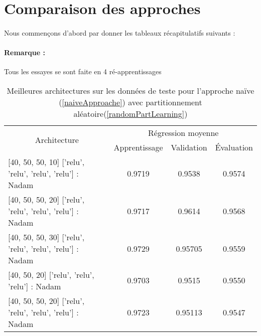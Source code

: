 \section{Comparaison des approches}
\paragraph{}Nous commençons d'abord par donner les tableaux récapitulatifs suivants :
\paragraph{Remarque : }Tous les essayes se sont faite en 4 ré-apprentissages 
\begin{table}[H]
	\centering
	\begin{tabular}{|l|c|c|c|}
		\hline
		\multicolumn{1}{|c|}{\multirow{2}{*}{Architecture}}               & \multicolumn{3}{c|}{Régression moyenne}         \\ \cline{2-4} 
		\multicolumn{1}{|c|}{}                                            & Apprentissage & Validation & Évaluation \\ \hline
		{[}40, 50, 50, 10{]} {[}'relu', 'relu', 'relu', 'relu'{]} : Nadam & 0.9719        & 0.9538     & 0.9574     \\ \hline
		{[}40, 50, 50, 20{]} {[}'relu', 'relu', 'relu', 'relu'{]} : Nadam & 0.9717        & 0.9614     & 0.9568     \\ \hline
		{[}40, 50, 50, 30{]} {[}'relu', 'relu', 'relu', 'relu'{]} : Nadam & 0.9729        & 0.95705    & 0.9559     \\ \hline
		{[}40, 50, 20{]} {[}'relu', 'relu', 'relu'{]} : Nadam             & 0.9703        & 0.9515     & 0.9550     \\ \hline
		{[}40, 50, 50, 20{]} {[}'relu', 'relu', 'relu', 'relu'{]} : Nadam & 0.9723        & 0.95113    & 0.9547     \\ \hline
	\end{tabular}
	\caption{Meilleures architectures sur les données de teste pour l'approche naïve (\ref{naiveApproache}) avec partitionnement aléatoire(\ref{randomPartLearning})}
\end{table}

